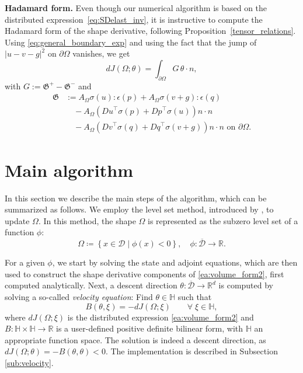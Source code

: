\documentclass[iicol,pdflatex,sn-mathphys-ay]{sn-jnl}%
\theoremstyle{thmstyleone}%
\theoremstyle{thmstyletwo}%
\theoremstyle{thmstylethree}%
\begin{document}
\textbf{Hadamard form.}
Even though our numerical algorithm is based on
the distributed expression~\eqref{eq:SDelast_inv},
it is instructive to compute the Hadamard form of the shape derivative,
following Proposition~\ref{tensor_relations}.
Using \eqref{eq:general_boundary_exp} and using the fact that the jump of $|u-v-g|^2$ on $\partial\Omega$ vanishes, we get
\begin{equation}
	dJ(\Omega;\theta) = \int_{\partial \Omega} G\, \theta\cdot n,
	\end{equation}
	with
	$G :=  \mathfrak{G}^+- \mathfrak{G}^-$ and 
\begin{align*}
	\mathfrak{G} & := A_{\Omega}\sigma(u):\epsilon(p) + A_{\Omega}\sigma(v+g):\epsilon(q)\\
			  & \quad - A_{\Omega} \left({Du}^{\top}\sigma(p) + {Dp}^{\top}\sigma(u)\right)n\cdot n\\
			  & \quad - A_{\Omega} \left({Dv}^{\top}\sigma(q) + {Dq}^{\top}\sigma(v+g)\right)n\cdot n \text{ on }\partial\Omega.
\end{align*}


\section{Main algorithm}\label{sec:algo}

In this section we describe the main steps of the algorithm,
which can be summarized as follows. 
We employ the level set method, introduced by %
\cite{MR965860}, to update $\Omega$. 
In this method, the shape $\Omega$ is represented as
the subzero level set of a function $\phi$:
\begin{equation} \label{eq:subdomain}
	\Omega\coloneqq\left\{x\in\mathcal{D}\mid\phi(x)<0\right\},
	\quad
	\phi\colon\overline{\mathcal{D}}\to\mathds{R}.
\end{equation}

For a given $\phi$, we start by solving the state and adjoint equations,
which are then used to construct the shape derivative components
of \eqref{ea:volume_form2}, first computed analytically.
Next, a descent direction $\theta\colon\overline{\mathcal{D}}\to\mathds{R}^d$
is computed by solving a so-called {\it velocity equation}:
Find $\theta\in\mathbb{H}$ such that
\begin{equation}\label{eq:velocity_eq0} 
	B(\theta,\xi)=-dJ(\Omega;\xi)
	\qquad
	\forall\;\xi\in\mathbb{H},
\end{equation}	
where $dJ(\Omega;\xi)$ is the distributed expression \eqref{ea:volume_form2}
and $B:\mathbb{H}\times\mathbb{H}\to\mathds{R}$ is a user-defined
positive definite bilinear form,
with $\mathbb{H}$ an appropriate function space.
The solution is indeed a descent direction, as
$dJ(\Omega;\theta)=-B(\theta,\theta)<0$.
The implementation is described in Subsection \ref{sub:velocity}.
\end{document}
